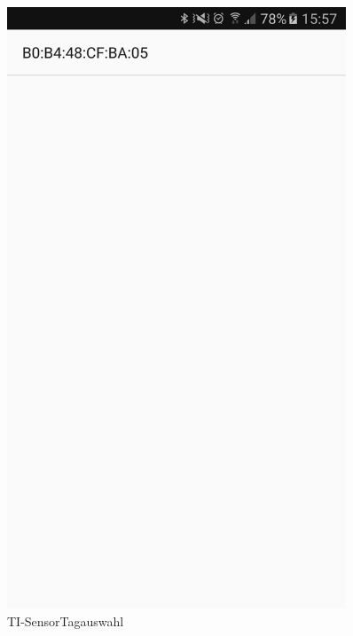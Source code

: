 \begin{figure}[ht]
 \begin{minipage}[t]{0.5\textwidth}
    \includegraphics[width=0.9\textwidth]{4Resultate/imag/BLEAdresseAuswaehlen.png} 
    \caption{TI-SensorTagauswahl}
    \label{sensorauswahl}
 \end{minipage}
 \begin{minipage}[t]{0.5\textwidth}

\end{minipage}
\end{figure}
